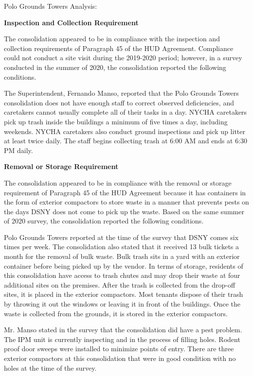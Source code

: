Polo Grounds Towers Analysis: 

\textbf{Inspection and Collection Requirement} 

 

The consolidation appeared to be in compliance with the inspection and collection requirements of Paragraph 45 of the HUD Agreement. Compliance could not conduct a site visit during the 2019-2020 period; however, in a survey conducted in the summer of 2020, the consolidation reported the following conditions.

The Superintendent, Fernando Manso, reported that the Polo Grounds Towers consolidation does not have enough staff to correct observed deficiencies, and caretakers cannot usually complete all of their tasks in a day. NYCHA caretakers pick up trash inside the buildings a minimum of five times a day, including weekends. NYCHA caretakers also conduct ground inspections and pick up litter at least twice daily. The staff begins collecting trash at 6:00 AM and ends at 6:30 PM daily.

\textbf{Removal or Storage Requirement} 

The consolidation appeared to be in compliance with the removal or storage requirement of Paragraph  45 of the HUD Agreement because it has containers in the form of exterior compactors to store waste in a manner that prevents pests on the days DSNY does not come to pick up the waste. Based on the same summer of  2020  survey, the consolidation reported the following conditions.

  

Polo Grounds Towers reported at the time of the survey that DSNY comes six times per week. The consolidation also stated that it received 13 bulk tickets a month for the removal of bulk waste. Bulk trash sits in a yard with an exterior container before being picked up by the vendor. In terms of storage, residents of this consolidation have access to trash chutes and may drop their waste at four additional sites on the premises. After the trash is collected from the drop-off sites, it is placed in the exterior compactors.  Most tenants dispose of their trash by throwing it out the windows or leaving it in front of the buildings. Once the waste is collected from the grounds, it is stored in the exterior compactors.  

 

Mr. Manso stated in the survey that the consolidation did have a pest problem. The IPM unit is currently inspecting and in the process of filling holes. Rodent proof door sweeps were installed to minimize points of entry.  There are three exterior compactors at this consolidation that were in good condition with no holes at the time of the survey.

